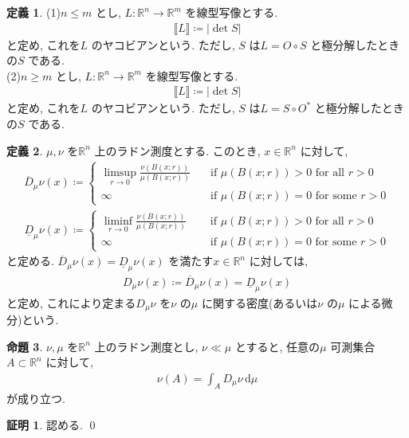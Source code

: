 \documentclass[twocolumn, landscape, a4paper , 8pt, fleqn, titlepage ]{jsarticle}
\theoremstyle{definition}
\newtheorem{dfn}{定義}[section]
\newtheorem{prop}[dfn]{命題}
\newtheorem*{pf*}{証明}
\newcommand{\abs}[1]{\left|#1\right|}
\newcommand{\dbra}[1]{\llbracket #1 \rrbracket}
\renewcommand{\d}{\, \textrm{d} }
\renewcommand{\-}{\hyphen}
\begin{document}
\begin{dfn}
(1)$n \leq m$ とし, $L:\mathbb R^n \rightarrow \mathbb R^m$ を線型写像とする. 
\begin{align*} \dbra L \coloneqq \abs{\det S} \end{align*}
と定め, これを$L$ のヤコビアンという. ただし, $S$ は$L = O \circ S$ と極分解したときの$S$ である. \\
(2)$n \geq m$ とし, $L:\mathbb R^n \rightarrow \mathbb R^m$ を線型写像とする. 
\begin{align*} \dbra L \coloneqq \abs{\det S} \end{align*}
と定め, これを$L$ のヤコビアンという. ただし, $S$ は$L = S \circ O^*$ と極分解したときの$S$ である. 
\end{dfn}



\begin{dfn}
$\mu, \nu$ を$\mathbb R^n$ 上のラドン測度とする. このとき, $x \in \mathbb R^n$ に対して,
\begin{align*} \overline D _\mu \nu (x) \coloneqq \begin{cases} \limsup_{r\rightarrow 0} \frac{\nu(B(x;r))}{\mu(B(x;r))} \quad &\textrm{if}\,\, \mu(B(x;r)) > 0\,\, \textrm{for all } r>0 \\  \infty \quad &\textrm{if}\,\, \mu(B(x;r)) = 0\,\, \textrm{for some } r>0 \end{cases}\end{align*}
\vspace{-20pt}
\begin{align*} \underline D _\mu \nu (x) \coloneqq \begin{cases} \liminf_{r\rightarrow 0} \frac{\nu(B(x;r))}{\mu(B(x;r))} \quad \,\,&\textrm{if}\,\, \mu(B(x;r)) > 0\,\, \textrm{for all } r>0 \\  \infty \quad \,\, &\textrm{if}\,\, \mu(B(x;r)) = 0\,\, \textrm{for some } r>0  \end{cases}\end{align*}
と定める. $\overline D _\mu \nu (x) = \underline D _\mu \nu (x)$ を満たす$x \in \mathbb R^n$ に対しては, 
\begin{align*} D_\mu \nu (x) \coloneqq \overline D _\mu \nu (x) = \underline D _\mu \nu (x) \end{align*}
と定め, これにより定まる$D_\mu \nu$ を$\nu$ の$\mu$ に関する密度(あるいは$\nu$ の$\mu$ による微分)という. 
\end{dfn}

\begin{prop}\label{9}
$\nu, \mu$ を$\mathbb R^n$ 上のラドン測度とし, $\nu \ll \mu$ とすると, 任意の$\mu$ 可測集合$A \subset \mathbb R^n$ に対して, 
\begin{align*} \nu (A) = \int_A D_\mu \nu \d \mu \end{align*}
が成り立つ.
\end{prop}
\begin{pf*}
認める.
\qed
\end{pf*}
\end{document}
